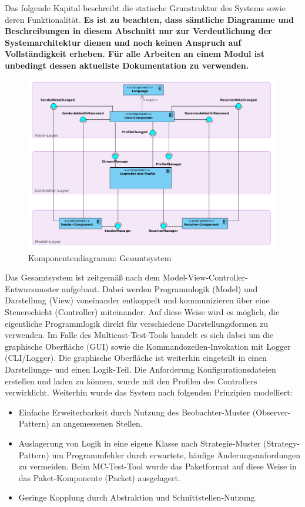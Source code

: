 Das folgende Kapital beschreibt die statische Grunstruktur des Systems sowie
deren Funktionalität.
{
\bf
Es ist zu beachten, dass sämtliche Diagramme und Beschreibungen in diesem
Abschnitt nur zur Verdeutlichung der Systemarchitektur dienen und noch
keinen Anspruch auf Vollständigkeit erheben. Für alle Arbeiten an einem Modul
ist unbedingt dessen aktuellste Dokumentation zu verwenden.
}

\begin{figure}[H]
\includegraphics[width=15cm]{images/Overview.png}
\centering
\caption{Komponentendiagramm: Gesamtsystem}
\label{uml_controller}
\end{figure}

Das Gesamtsystem ist zeitgemäß nach dem Model-View-Controller-Entwursmuster
aufgebaut. Dabei werden Programmlogik (Model) und Darstellung (View) voneinander
entkoppelt und kommunizieren über eine Steuerschicht (Controller) miteinander.
Auf diese Weise wird es möglich, die eigentliche Programmlogik direkt für
verschiedene Darstellungsformen zu verwenden. Im Falle des Multicast-Test-Tools
handelt es sich dabei um die graphische Oberfläche (GUI) sowie die
Kommandozeilen-Invokation mit Logger (CLI/Logger). Die graphische Oberfläche ist
weiterhin eingeteilt in einen Darstellungs- und einen Logik-Teil. Die
Anforderung Konfigurationsdateien erstellen und laden zu können, wurde mit den
Profilen des Controllers verwirklicht. Weiterhin wurde das System nach
folgenden Prinzipien modelliert:
\begin{itemize}
  \item Einfache Erweiterbarkeit durch Nutzung des Beobachter-Muster
  (Observer-Pattern) an angemessenen Stellen.
  \item Auslagerung von Logik in eine eigene Klasse nach Strategie-Muster
  (Strategy-Pattern) um Programmfehler durch erwartete, häufige
  Änderungsanfordungen zu vermeiden. Beim MC-Test-Tool wurde das Paketformat auf
  diese Weise in das Paket-Komponente (Packet) ausgelagert.
  \item Geringe Kopplung durch Abstraktion und Schnittstellen-Nutzung.
\end{itemize}

